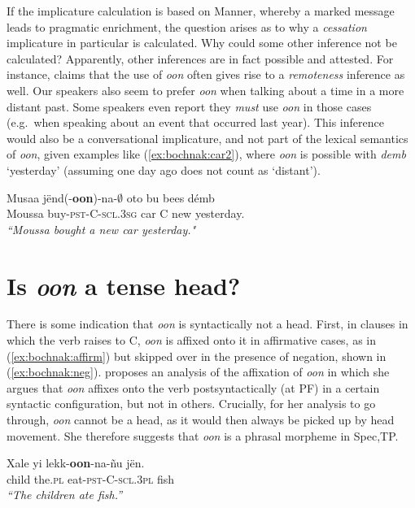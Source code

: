 \documentclass[output=paper]{langsci/langsci}
\begin{document}
If the implicature calculation is based on Manner, whereby a marked message leads to pragmatic enrichment, the question arises as to why a \textit{cessation} implicature in particular is calculated. Why  could some other inference not be calculated? Apparently, other inferences are in fact possible and attested. For instance, \citet{church81systeme} claims that the use of \textit{oon}
often gives rise to a \textit{remoteness} inference as well. Our speakers also seem to prefer \textit{oon} when talking about a time in a more distant past. Some speakers even report they \textit{must} use \textit{oon} in those cases (e.g.~when speaking about an event that occurred last year). This inference would also be a conversational implicature, and not part of the lexical semantics of \textit{oon}, given examples like (\ref{ex:bochnak:car2}), where \textit{oon} is possible with \textit{demb} `yesterday' (assuming one day ago does not count as `distant').

\ea\label{ex:bochnak:car2}
\gll Musaa j\"end(-\textbf{oon})-na-$\emptyset$ oto bu bees d\'emb \\
Moussa buy\textsc{-pst-C-scl.3sg} car C new yesterday. \\
\glt \textit{``Moussa bought a new car yesterday."} 
\z



\section{Is \textit{oon} a tense head?}

There is some indication that \textit{oon} is syntactically not a
head. First, in clauses in which the verb raises to C, \textit{oon} is
affixed onto it in affirmative cases, as in (\ref{ex:bochnak:affirm}) but skipped over in the presence
of negation, shown in (\ref{ex:bochnak:neg}). \cite{Martinovic2015b, Martinovic2016a} proposes an
analysis of the affixation of \textit{oon} in which she argues that
\textit{oon} affixes onto
the verb postsyntactically (at PF) in a certain syntactic
configuration, but not in others. Crucially, for her analysis to go
through, \textit{oon} cannot be a head, as it would then always be
picked up by head movement. She therefore suggests that \textit{oon}
is a phrasal morpheme in Spec,TP.


  
\ea
\gll Xale yi lekk-\textbf{oon}-na-\~nu j\"en.\\
child the.\textsc{pl} eat-\textsc{pst-C-scl.3pl} fish\\
\glt \textit{``The children ate fish.''}\label{ex:bochnak:affirm}
\z
\end{document}
